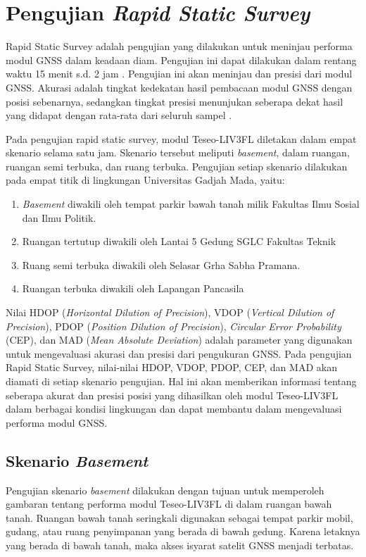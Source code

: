\section{Pengujian \textit{Rapid Static Survey}}
Rapid Static Survey adalah pengujian yang dilakukan untuk meninjau performa modul GNSS dalam keadaan diam. Pengujian ini dapat dilakukan dalam rentang waktu 15 menit s.d. 2 jam \cite{lauer2019static}. Pengujian ini akan meninjau  dan presisi dari modul GNSS. Akurasi adalah tingkat kedekatan hasil pembacaan modul GNSS dengan posisi sebenarnya, sedangkan tingkat presisi menunjukan seberapa dekat hasil yang didapat dengan rata-rata dari seluruh sampel \cite{gnssca_apn029}.

Pada pengujian rapid static survey, modul Teseo-LIV3FL diletakan dalam empat skenario selama satu jam. Skenario tersebut meliputi \textit{basement}, dalam ruangan, ruangan semi terbuka, dan ruang terbuka. Pengujian setiap skenario dilakukan pada empat titik di lingkungan Universitas Gadjah Mada, yaitu:

\begin{enumerate}
	\item \textit{Basement} diwakili oleh tempat parkir bawah tanah milik Fakultas Ilmu Sosial dan Ilmu Politik.
	\item Ruangan tertutup diwakili oleh Lantai 5 Gedung SGLC Fakultas Teknik
	\item Ruang semi terbuka diwakili oleh Selasar Grha Sabha Pramana.
	\item Ruangan terbuka diwakili oleh Lapangan Pancasila
\end{enumerate}

Nilai HDOP (\textit{Horizontal Dilution of Precision}), VDOP (\textit{Vertical Dilution of Precision}), PDOP (\textit{Position Dilution of Precision}), \textit{Circular Error Probability} (CEP), dan MAD (\textit{Mean Absolute Deviation}) adalah parameter yang digunakan untuk mengevaluasi akurasi dan presisi dari pengukuran GNSS. Pada pengujian Rapid Static Survey, nilai-nilai HDOP, VDOP, PDOP, CEP, dan MAD akan diamati di setiap skenario pengujian. Hal ini akan memberikan informasi tentang seberapa akurat dan presisi posisi yang dihasilkan oleh modul Teseo-LIV3FL dalam berbagai kondisi lingkungan dan dapat membantu dalam mengevaluasi performa modul GNSS.

\subsection{Skenario \textit{Basement}}
Pengujian skenario \textit{basement} dilakukan dengan tujuan untuk memperoleh gambaran tentang performa modul Teseo-LIV3FL di dalam ruangan bawah tanah. Ruangan bawah tanah seringkali digunakan sebagai tempat parkir mobil, gudang, atau ruang penyimpanan yang berada di bawah gedung. Karena letaknya yang berada di bawah tanah, maka akses isyarat satelit GNSS menjadi terbatas. 

